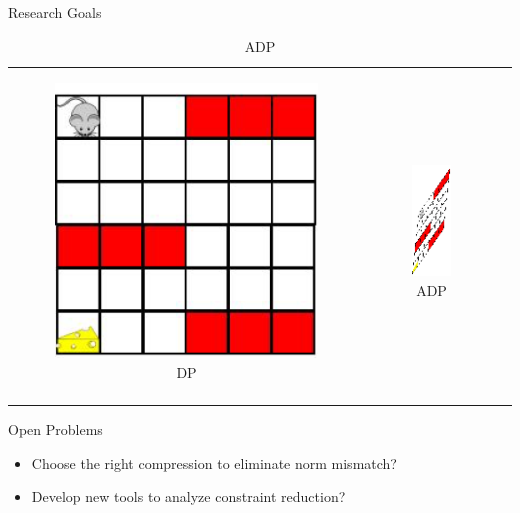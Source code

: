 \documentclass[10pt,handout]{beamer}
\begin{document}
\begin{frame}[fragile]{Research Goals}
\begin{table}
\begin{tabular}{ccc}

\begin{minipage}{0.3\textwidth}
\begin{figure}
\includegraphics[scale=0.2]{mouse-single.png}
\caption*{DP}
\end{figure}
\end{minipage}
&
\begin{minipage}{0.3\textwidth}
\begin{figure}
\includegraphics[scale=0.2]{compress-mouse.png}
\caption*{ADP}
\end{figure}
\end{minipage}
&
\begin{minipage}{0.3\textwidth}
{\color{orange}{$\norm{J^*-\tj}_\infty$?}}\\
\end{minipage}
\end{tabular}
\end{table}
\begin{block}{Open Problems}
\begin{itemize}
\item Choose the right compression to eliminate norm mismatch?
\item Develop new tools to analyze constraint reduction?
\end{itemize}
\end{block}
\end{frame}
\end{document}
